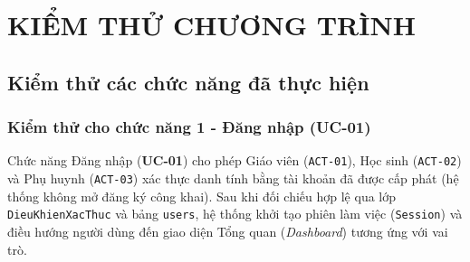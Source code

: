\documentclass[12pt,a4paper]{report}
\begin{document}
\setcounter{chapter}{5}
\chapter{KIỂM THỬ CHƯƠNG TRÌNH}
\section{Kiểm thử các chức năng đã thực hiện}

\subsection{Kiểm thử cho chức năng 1 - Đăng nhập (UC-01)}
\label{subsec:test_uc01}

Chức năng Đăng nhập (\textbf{UC-01}) cho phép Giáo viên (\texttt{ACT-01}), Học sinh (\texttt{ACT-02}) và Phụ huynh (\texttt{ACT-03}) xác thực danh tính bằng tài khoản đã được cấp phát (hệ thống không mở đăng ký công khai). Sau khi đối chiếu hợp lệ qua lớp \texttt{DieuKhienXacThuc} và bảng \texttt{users}, hệ thống khởi tạo phiên làm việc (\texttt{Session}) và điều hướng người dùng đến giao diện Tổng quan (\textit{Dashboard}) tương ứng với vai trò.
\end{document}

